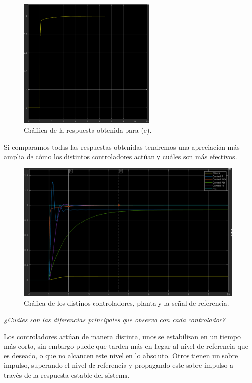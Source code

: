 \documentclass[12pt, letterpaper]{article}
\begin{document}
\begin{enumerate}
\begin{enumerate}
				\begin{figure}[H]
					\centering
					\includegraphics[width=0.6\textwidth]{1ee.png}
					\caption{Gráfiica de la respuesta obtenida para (e).}
				\end{figure}

				Si comparamos todas las respuestas obtenidas tendremos una apreciación más amplia de cómo los distintos controladores actúan y cuáles son más efectivos.
				
				\begin{figure}[H]
					\centering
					\includegraphics[width=\textwidth]{1t.png}
					\caption{Gráfica de los distinos controladores, planta y la señal de referencia.}
				\end{figure}
				\textit{¿Cuáles son las diferencias principales que observa con cada controlador?}

				Los controladores actúan de manera distinta, unos se estabilizan en un tiempo más corto, sin embargo puede que tarden más en llegar al nivel de referencia que es deseado, o que no alcancen este nivel en lo absoluto. Otros tienen un sobre impulso, superando el nivel de referencia y propagando este sobre impulso a través de la respuesta estable del sistema.


\end{enumerate}
\end{enumerate}
\end{document}

